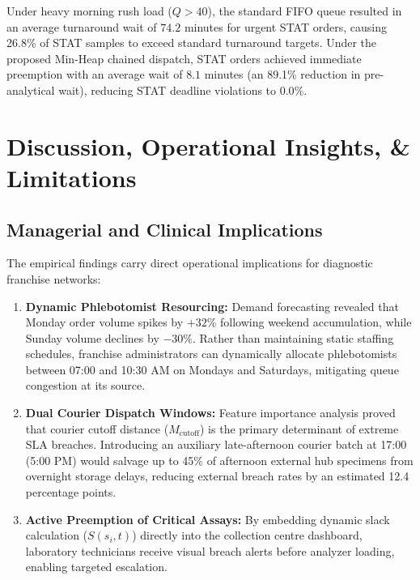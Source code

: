 \documentclass[conference]{IEEEtran}
\begin{document}
Under heavy morning rush load ($Q > 40$), the standard FIFO queue resulted in an average turnaround wait of $74.2$ minutes for urgent STAT orders, causing 26.8\% of STAT samples to exceed standard turnaround targets. Under the proposed Min-Heap chained dispatch, STAT orders achieved immediate preemption with an average wait of $8.1$ minutes (an 89.1\% reduction in pre-analytical wait), reducing STAT deadline violations to $0.0\%$.

\section{Discussion, Operational Insights, \& Limitations}

\subsection{Managerial and Clinical Implications}
The empirical findings carry direct operational implications for diagnostic franchise networks:
\begin{enumerate}
    \item \textbf{Dynamic Phlebotomist Resourcing:} Demand forecasting revealed that Monday order volume spikes by $+32\%$ following weekend accumulation, while Sunday volume declines by $-30\%$. Rather than maintaining static staffing schedules, franchise administrators can dynamically allocate phlebotomists between 07:00 and 10:30 AM on Mondays and Saturdays, mitigating queue congestion at its source.
    \item \textbf{Dual Courier Dispatch Windows:} Feature importance analysis proved that courier cutoff distance ($M_{\text{cutoff}}$) is the primary determinant of extreme SLA breaches. Introducing an auxiliary late-afternoon courier batch at 17:00 (5:00 PM) would salvage up to 45\% of afternoon external hub specimens from overnight storage delays, reducing external breach rates by an estimated 12.4 percentage points.
    \item \textbf{Active Preemption of Critical Assays:} By embedding dynamic slack calculation ($S(s_i, t)$) directly into the collection centre dashboard, laboratory technicians receive visual breach alerts before analyzer loading, enabling targeted escalation.
\end{enumerate}
\end{document}
